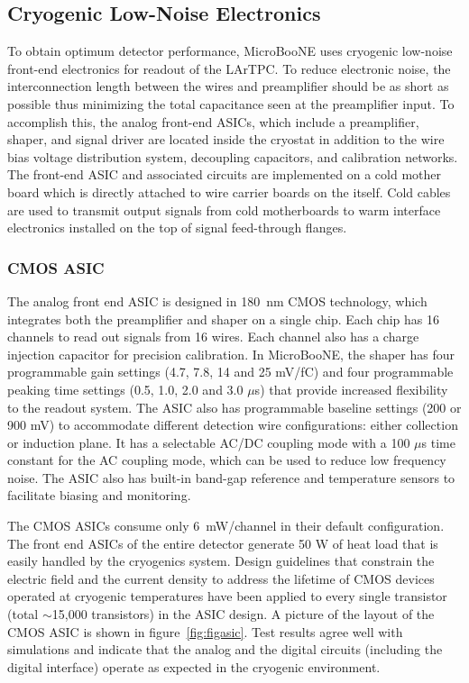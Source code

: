 \subsection{Cryogenic Low-Noise Electronics}
\label{sec:coldelectronics}
To obtain optimum detector performance, MicroBooNE uses cryogenic low-noise front-end electronics for readout of the LArTPC. To reduce electronic noise, the interconnection length between the \lartpc wires and preamplifier should be as short as possible thus minimizing the total capacitance seen at the preamplifier input. To accomplish this, the analog front-end ASICs, which include a preamplifier, shaper, and signal driver are located inside the cryostat in addition to the wire bias voltage distribution system, decoupling capacitors, and calibration networks. The front-end ASIC and associated circuits are implemented on a cold mother board which is directly attached to wire carrier boards on the \lartpc itself. Cold cables are used to transmit output signals from cold motherboards to warm interface electronics installed on the top of signal feed-through flanges.

\subsubsection{CMOS ASIC}

The analog front end ASIC is designed in 180~nm CMOS technology, which integrates both the preamplifier and shaper on a single chip. Each chip has 16 channels to read out signals from 16 wires. Each channel also has a charge injection capacitor for precision calibration. In MicroBooNE, the shaper has four programmable gain settings (4.7, 7.8, 14 and 25 mV/fC) and four programmable peaking time settings (0.5, 1.0, 2.0 and 3.0 $\mu$s) that provide increased flexibility to the readout system. The ASIC also has programmable baseline settings (200 or 900 mV) to accommodate different detection wire configurations: either collection or induction plane. It has a selectable AC/DC coupling mode with a 100 $\mu$s time constant for the AC coupling mode, which can be used to reduce low frequency noise. The ASIC also has built-in band-gap reference and temperature sensors to facilitate biasing and monitoring.

The CMOS ASICs consume only 6~mW/channel in their default configuration. The front end ASICs of the entire detector generate 50 W of heat load that is easily handled by the cryogenics system. Design guidelines that constrain the electric field and the current density to address the lifetime of CMOS devices operated at cryogenic temperatures have been applied to every single transistor (total $\sim$15,000 transistors) in the ASIC design. A picture of the layout of the CMOS ASIC is shown in figure~\ref{fig:figasic}. Test results agree well with simulations and indicate that the analog and the digital circuits (including the digital interface) operate as expected in the cryogenic environment. 


